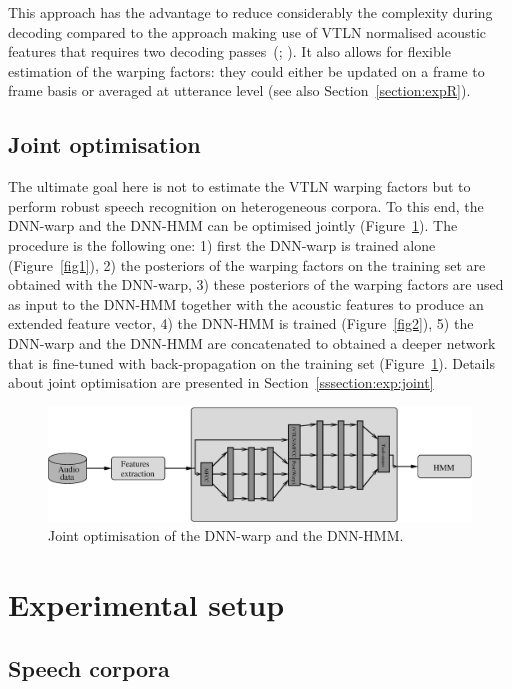 \documentclass{nle}
\begin{document}
This approach has the  advantage to reduce considerably the complexity
during decoding compared to the approach making use of VTLN normalised
acoustic features that requires two decoding passes~(\citealp{LeeRos96}; \citealp*{WelKanNey99}). It also allows for flexible estimation of the warping factors: they could either be updated on a frame to frame basis or averaged at utterance level (see also Section~\ref{section:expR}).

\subsection{Joint optimisation}
The ultimate goal here is not to estimate the VTLN warping factors but to perform robust speech recognition on heterogeneous corpora. To this end, the DNN-warp and the DNN-HMM can be optimised jointly (Figure~\ref{fig3}). The procedure is the following one: 1) first the DNN-warp is trained alone (Figure~\ref{fig1}), 2) the posteriors of the warping factors on the training set are obtained with the DNN-warp, 3) these posteriors of the warping factors are used as input to the DNN-HMM together with the acoustic features to produce an extended feature vector, 4) the DNN-HMM is trained (Figure~\ref{fig2}), 5)  the DNN-warp and the DNN-HMM are concatenated to obtained a deeper network that is fine-tuned with back-propagation on the training set (Figure~\ref{fig3}). Details about joint optimisation are presented in Section~\ref{sssection:exp:joint}

  \begin{figure}
       \includegraphics[width=\textwidth]{fig3}
          \caption{Joint optimisation of the DNN-warp and the DNN-HMM.} 
     	\label{fig3}
  \end{figure}

\section{Experimental setup}\label{section:expS}
\subsection{Speech corpora}
\end{document}
